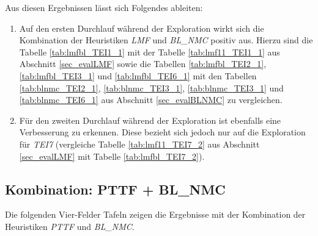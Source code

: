 \begin{multicols}{2}
\columnbreak
{}
\end{multicols}

\begin{multicols}{2}
\columnbreak
{}
\end{multicols}

\begin{multicols}{2}
\columnbreak
{}
\end{multicols}
\noindent
Aus diesen Ergebnissen lässt sich Folgendes ableiten:
\begin{enumerate}
\item Auf den ersten Durchlauf während der Exploration wirkt sich die Kombination der Heuristiken \emph{LMF} und \emph{BL\_NMC} positiv aus. Hierzu sind die Tabelle \ref{tab:lmfbl_TEI1_1} mit der Tabelle \ref{tab:lmf11_TEI1_1} aus Abschnitt \ref{sec_evalLMF} sowie die Tabellen \ref{tab:lmfbl_TEI2_1}, \ref{tab:lmfbl_TEI3_1} und \ref{tab:lmfbl_TEI6_1} mit den Tabellen \ref{tab:blnmc_TEI2_1}, \ref{tab:blnmc_TEI3_1}, \ref{tab:blnmc_TEI3_1} und \ref{tab:blnmc_TEI6_1} aus Abschnitt \ref{sec_evalBLNMC} zu vergleichen.
\item Für den zweiten Durchlauf während der Exploration ist ebenfalls eine Verbesserung zu erkennen. Diese bezieht sich jedoch nur auf die Exploration für \emph{TEI7} (vergleiche Tabelle \ref{tab:lmf11_TEI7_2} aus Abschnitt \ref{sec_evalLMF} mit Tabelle \ref{tab:lmfbl_TEI7_2}).
\end{enumerate}

\subsection{Kombination: PTTF + BL\_NMC}\label{sec_evalPTTFBLNMC}
Die folgenden Vier-Felder Tafeln zeigen die Ergebnisse mit der Kombination der Heuristiken \emph{PTTF} und \emph{BL\_NMC}.
\begin{multicols}{3}
\columnbreak
{}\columnbreak
{}
\end{multicols}

